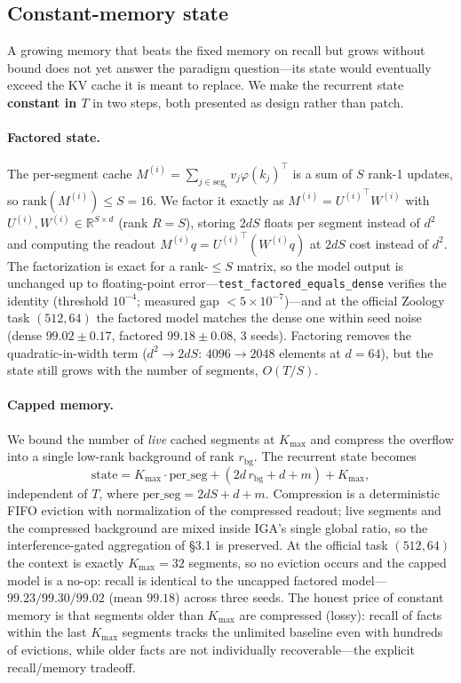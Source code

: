 \documentclass[11pt]{article}
\begin{document}
\subsection{Constant-memory state}

A growing memory that beats the fixed memory on recall but grows without bound
does not yet answer the paradigm question---its state would eventually exceed the
KV cache it is meant to replace. We make the recurrent state \textbf{constant in
$T$} in two steps, both presented as design rather than patch.

\paragraph{Factored state.} The per-segment cache
$M^{(i)}=\sum_{j\in\mathrm{seg}_i}v_j\varphi(k_j)^\top$ is a sum of $S$ rank-1
updates, so $\mathrm{rank}(M^{(i)})\le S=16$. We factor it exactly as
$M^{(i)}={U^{(i)}}^\top W^{(i)}$ with $U^{(i)},W^{(i)}\in\mathbb{R}^{S\times d}$
(rank $R=S$), storing $2dS$ floats per segment instead of $d^2$ and computing the
readout $M^{(i)}q = {U^{(i)}}^\top(W^{(i)}q)$ at $2dS$ cost instead of $d^2$. The
factorization is exact for a rank-$\le S$ matrix, so the model output is
unchanged up to floating-point error---\texttt{test\_factored\_equals\_dense}
verifies the identity (threshold $10^{-4}$; measured gap $<\!5\times10^{-7}$)---and
at the official Zoology task $(512,64)$ the factored model matches the dense one
within seed noise (dense $99.02\pm0.17$, factored $99.18\pm0.08$, 3 seeds).
Factoring removes the quadratic-in-width term ($d^2\to 2dS$: $4096\to 2048$
elements at $d=64$), but the state still grows with the number of segments,
$O(T/S)$.

\paragraph{Capped memory.} We bound the number of \emph{live} cached segments at
$K_{\max}$ and compress the overflow into a single low-rank background of rank
$r_{\mathrm{bg}}$. The recurrent state becomes
\[
\mathrm{state} = K_{\max}\!\cdot\!\mathrm{per\_seg}
               + (2d\,r_{\mathrm{bg}} + d + m) + K_{\max},
\]
independent of $T$, where $\mathrm{per\_seg}=2dS+d+m$. Compression is a
deterministic FIFO eviction with normalization of the compressed readout; live
segments and the compressed background are mixed inside IGA's single global ratio,
so the interference-gated aggregation of \S3.1 is preserved. At the official task
$(512,64)$ the context is exactly $K_{\max}=32$ segments, so no eviction occurs and
the capped model is a no-op: recall is identical to the uncapped factored
model---$99.23/99.30/99.02$ (mean $99.18$) across three seeds. The honest price of
constant memory is that segments older than $K_{\max}$ are compressed (lossy):
recall of facts within the last $K_{\max}$ segments tracks the unlimited baseline
even with hundreds of evictions, while older facts are not individually
recoverable---the explicit recall/memory tradeoff.
\end{document}
